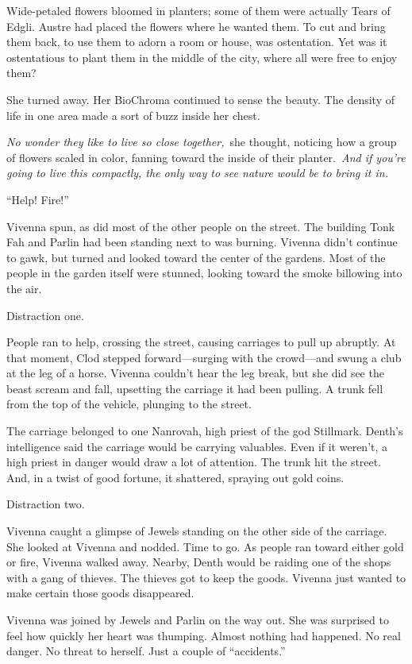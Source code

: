 Wide-petaled flowers bloomed in planters; some of them were actually Tears of Edgli. Austre had placed the flowers where he wanted them. To cut and bring them back, to use them to adorn a room or house, was ostentation. Yet was it ostentatious to plant them in the middle of the city, where all were free to enjoy them?

She turned away. Her BioChroma continued to sense the beauty. The density of life in one area made a sort of buzz inside her chest.

\textit{No wonder they like to live so close together,}~she thought, noticing how a group of flowers scaled in color, fanning toward the inside of their planter.~\textit{And if you’re going to live this compactly, the only way to see nature would be to bring it in.}

“Help! Fire!”

Vivenna spun, as did most of the other people on the street. The building Tonk Fah and Parlin had been standing next to was burning. Vivenna didn’t continue to gawk, but turned and looked toward the center of the gardens. Most of the people in the garden itself were stunned, looking toward the smoke billowing into the air.

Distraction one.

People ran to help, crossing the street, causing carriages to pull up abruptly. At that moment, Clod stepped forward—surging with the crowd—and swung a club at the leg of a horse. Vivenna couldn’t hear the leg break, but she did see the beast scream and fall, upsetting the carriage it had been pulling. A trunk fell from the top of the vehicle, plunging to the street.

The carriage belonged to one Nanrovah, high priest of the god Stillmark. Denth’s intelligence said the carriage would be carrying valuables. Even if it weren’t, a high priest in danger would draw a lot of attention. The trunk hit the street. And, in a twist of good fortune, it shattered, spraying out gold coins.

Distraction two.

Vivenna caught a glimpse of Jewels standing on the other side of the carriage. She looked at Vivenna and nodded. Time to go. As people ran toward either gold or fire, Vivenna walked away. Nearby, Denth would be raiding one of the shops with a gang of thieves. The thieves got to keep the goods. Vivenna just wanted to make certain those goods disappeared.

Vivenna was joined by Jewels and Parlin on the way out. She was surprised to feel how quickly her heart was thumping. Almost nothing had happened. No real danger. No threat to herself. Just a couple of “accidents.”

